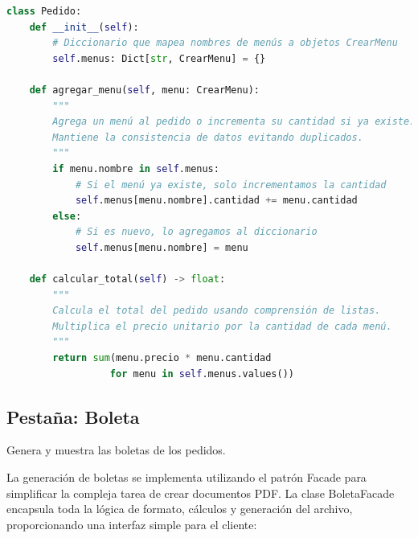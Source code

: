 \documentclass[12pt,letterpaper]{article}
\begin{document}
\begin{lstlisting}[language=Python, caption=Gestión de Pedidos]
class Pedido:
    def __init__(self):
        # Diccionario que mapea nombres de menús a objetos CrearMenu
        self.menus: Dict[str, CrearMenu] = {}

    def agregar_menu(self, menu: CrearMenu):
        """
        Agrega un menú al pedido o incrementa su cantidad si ya existe.
        Mantiene la consistencia de datos evitando duplicados.
        """
        if menu.nombre in self.menus:
            # Si el menú ya existe, solo incrementamos la cantidad
            self.menus[menu.nombre].cantidad += menu.cantidad
        else:
            # Si es nuevo, lo agregamos al diccionario
            self.menus[menu.nombre] = menu

    def calcular_total(self) -> float:
        """
        Calcula el total del pedido usando comprensión de listas.
        Multiplica el precio unitario por la cantidad de cada menú.
        """
        return sum(menu.precio * menu.cantidad 
                  for menu in self.menus.values())
\end{lstlisting}

\subsection{Pestaña: Boleta}
Genera y muestra las boletas de los pedidos.

La generación de boletas se implementa utilizando el patrón Facade para simplificar la compleja tarea de crear documentos PDF. La clase BoletaFacade encapsula toda la lógica de formato, cálculos y generación del archivo, proporcionando una interfaz simple para el cliente:
\end{document}
